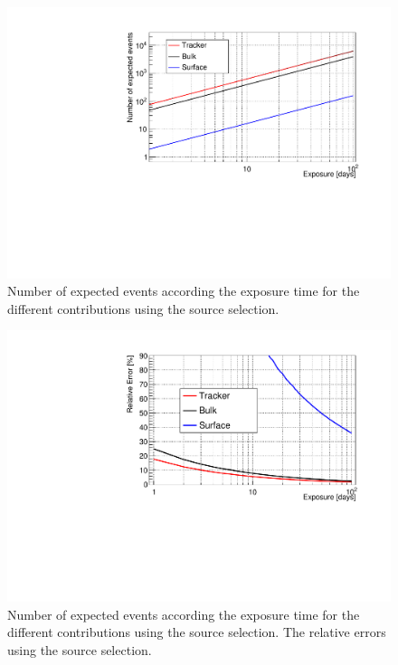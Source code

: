 \documentclass[main.tex]{subfiles}
\begin{document}
\begin{figure}[h!]
\begin{center}
\includegraphics[scale=0.6]{pictures/Chap5/nexpected_source_selection.pdf}
\caption{Number of expected events according the exposure time for the different contributions using the source selection.}
\label{picture_number_of_expected_events_source_selection}
\end{center}
\end{figure}


\begin{figure}[h!]
\begin{center}
\includegraphics[scale=0.6]{pictures/Chap5/n_source_selection_last_results.pdf}
\caption{Number of expected events according the exposure time for the different contributions using the source selection. The relative errors using the source selection.}
\label{picture_relative_error_source_selection}
\end{center}
\end{figure}
\end{document}

